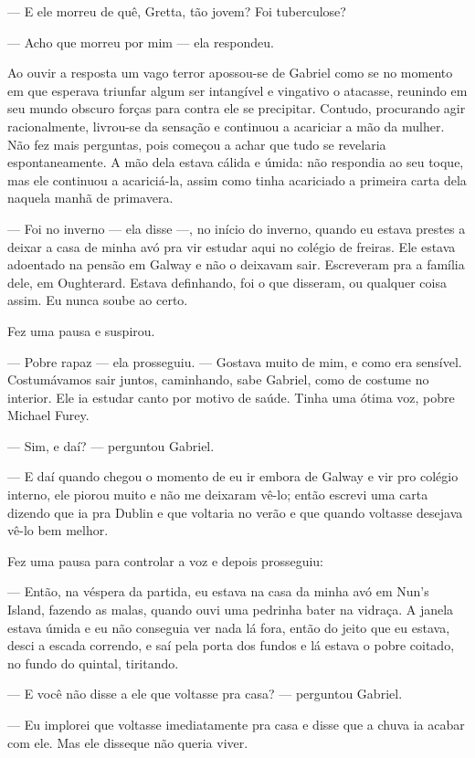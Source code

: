 --- E ele morreu de quê, Gretta, tão jovem? Foi tuberculose?

--- Acho que morreu por mim --- ela respondeu.

Ao ouvir a resposta um vago terror apossou-se de Gabriel como se no
momento em que esperava triunfar algum ser
intangível e vingativo o atacasse, reunindo em seu mundo obscuro forças
para contra ele se precipitar. Contudo, procurando agir racionalmente,
livrou-se da sensação e continuou a acariciar a mão da mulher. Não fez
mais perguntas, pois começou a achar que tudo se revelaria
espontaneamente. A mão dela estava cálida e úmida: não respondia ao
seu toque, mas ele continuou a acariciá-la, assim como tinha
acariciado a primeira carta dela naquela manhã de primavera.

--- Foi no inverno --- ela disse ---, no início do inverno, quando
eu estava prestes a deixar a casa de minha avó pra vir estudar aqui no
colégio de freiras. Ele estava adoentado na pensão em Galway e não o
deixavam sair. Escreveram pra a família dele, em Oughterard. Estava
definhando, foi o que disseram, ou qualquer coisa assim. Eu nunca
soube ao certo.

Fez uma pausa e suspirou.

--- Pobre rapaz --- ela prosseguiu. --- Gostava muito de mim, e como
era sensível. Costumávamos sair juntos, caminhando, sabe Gabriel, como
de costume no interior. Ele ia estudar canto por motivo de saúde.
Tinha uma ótima voz, pobre Michael Furey.

--- Sim, e daí? --- perguntou Gabriel.

--- E daí quando chegou o momento de eu ir embora de Galway e vir pro
colégio interno, ele piorou muito e não me deixaram vê-lo; então
escrevi uma carta dizendo que ia pra Dublin e que voltaria no verão e
que quando voltasse desejava vê-lo bem melhor.

Fez uma pausa para controlar a voz e depois prosseguiu:

--- Então, na véspera da partida, eu estava na casa da minha avó em
Nun's Island, fazendo as malas, quando ouvi uma pedrinha bater na
vidraça. A janela estava úmida e eu não conseguia ver nada lá fora,
então do jeito que eu estava, desci a escada correndo, e saí pela
porta dos fundos e lá estava o pobre coitado, no fundo do quintal,
tiritando.

--- E você não disse a ele que voltasse pra casa? --- perguntou
Gabriel.

--- Eu implorei que voltasse imediatamente pra casa e disse que a
chuva ia acabar com ele. Mas ele disseque não queria viver.

